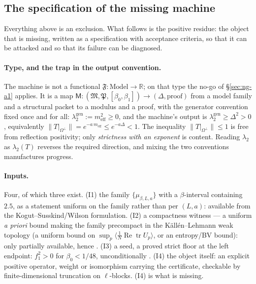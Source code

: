 \subsection{The specification of the missing machine}
\label{sec:ng-spec}

Everything above is an exclusion. What follows is the positive residue: the object that is missing,
written as a specification with acceptance criteria, so that it can be attacked and so that its
failure can be diagnosed.

\paragraph{Type, and the trap in the output convention.}
The machine is not a functional $\mathfrak F:\text{Model}\to\mathbb R$; on that type the no-go of
\S\ref{sec:ng-a1} applies. It is a map $\mathsf M:(\mathfrak M,\mathfrak P,[\beta_0,\beta_1])\to(\Delta,\text{proof})$
from a model family and a structural packet to a modulus and a proof, with the generator convention
fixed once and for all:
$\lambda_2^{\mathrm{gen}}:=m_{\mathrm{eff}}^2\ge0$, and the machine's output is
$\lambda_2^{\mathrm{gen}}\ge\Delta^2>0$, equivalently
$\|T|_{\Omega^\perp}\|=e^{-a\,m_{\mathrm{eff}}}\le e^{-a\Delta}<1$. The inequality $\|T|_{\Omega^\perp}\|\le1$
is free from reflection positivity; only \emph{strictness with an exponent} is content. Reading
$\lambda_2$ as $\lambda_2(T)$ reverses the required direction, and mixing the two conventions
manufactures progress.

\paragraph{Inputs.}
Four, of which three exist. (I1) the family $\{\mu_{\beta,L,a}\}$ with a $\beta$-interval containing
$2.5$, as a statement uniform on the family rather than per $(L,a)$: available from the
Kogut--Susskind/Wilson formulation. (I2) a compactness witness --- a uniform \emph{a priori} bound
making the family precompact in the Käll\'en--Lehmann weak topology (a uniform bound on
$\sup_p\langle\tfrac1N\operatorname{Re}\operatorname{tr}U_p\rangle$, or an entropy/BV bound): only
partially available, hence \LM. (I3) a seed,
a proved strict floor at the left endpoint: $f_1^2>0$ for $\beta_0<1/48$, unconditionally \LT. (I4)
the object itself: an explicit positive operator, weight or isomorphism carrying the certificate,
checkable by finite-dimensional truncation on $\ell$-blocks. (I4) is what is missing.

